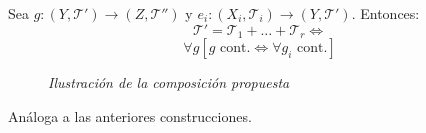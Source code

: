 \begin{theo}
Sea $g: \left( Y, \mathcal{T}' \right) \rightarrow \left( Z, \mathcal{T}'' \right)$ y $e_i: \left( X_i, \mathcal{T}_i \right) \rightarrow \left( Y, \mathcal{T}' \right)$. Entonces:
    \[
    \mathcal{T}' = \mathcal{T}_1 + \ldots + \mathcal{T}_r \Leftrightarrow  
    \]
    \begin{equation}\label{eq:prop_universal_sum}
        \forall g \left[ g \text{ cont.} \Leftrightarrow \forall g_i \text{ cont.} \right]
    \end{equation}

    \begin{figure}[H]
        \centering    
        \caption{\textit{Ilustración de la composición propuesta}}
        \label{prop_universal_sum_finitas}
    \end{figure}
\end{theo}
\begin{demo}
    Análoga a las anteriores construcciones.
\end{demo}

